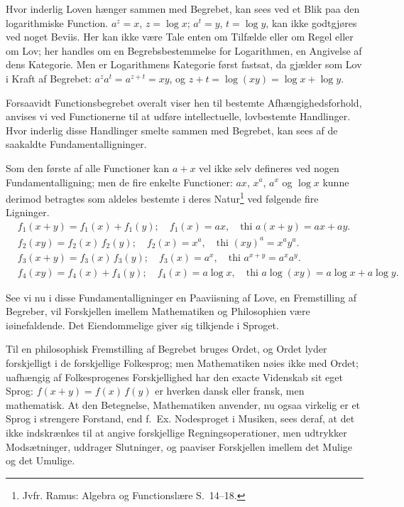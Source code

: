 \documentclass[12pt]{book}
\newcommand{\opage}[1]{\marginnote{\footnotesize\textit{[#1]}}}
\begin{document}
Hvor inderlig Loven hænger sammen med Begrebet, kan sees ved et Blik paa den
logarithmiske Function. $a^{z} = x$, $z = \log x$; $a^{t} = y$, $t = \log y$,
kan ikke godtgjøres ved noget Beviis. Her kan ikke være Tale enten om Tilfælde
eller om Regel eller om Lov; her handles om
\opage{9} en Begrebsbestemmelse for Logarithmen, en Angivelse af dens Kategorie. Men er
Logarithmens Kategorie først fastsat, da gjælder som Lov i Kraft af Begrebet:
$a^{z}a^{t} = a^{z+t} = xy$, og $z+t = \log(xy) = \log x + \log y$.

Forsaavidt Functionsbegrebet overalt viser hen til bestemte
Afhængighedsforhold, anvises vi ved Functionerne til at udføre intellectuelle,
lovbestemte Handlinger. Hvor inderlig disse Handlinger smelte sammen med
Begrebet, kan sees af de saakaldte Fundamentalligninger.

Som den første af alle Functioner kan $a+x$ vel ikke selv defineres ved nogen
Fundamentalligning; men de fire enkelte Functioner: $ax$, $x^{a}$, $a^{x}$ og
$\log x$ kunne derimod betragtes som aldeles bestemte i deres
Natur\footnote{Jvfr. Ramus: Algebra og Functionslære S.\ 14--18.} ved følgende
fire Ligninger.
\[
\begin{aligned}
&f_{1}(x+y) = f_{1}(x) + f_{1}(y); \quad f_{1}(x) = ax,
      \quad \text{thi } a(x+y) = ax + ay.\\[2pt]
&f_{2}(xy) = f_{2}(x)\,f_{2}(y); \quad f_{2}(x) = x^{a},
      \quad \text{thi } (xy)^{a} = x^{a}y^{a}.\\[2pt]
&f_{3}(x+y) = f_{3}(x)\,f_{3}(y); \quad f_{3}(x) = a^{x},
      \quad \text{thi } a^{x+y} = a^{x}a^{y}.\\[2pt]
&f_{4}(xy) = f_{4}(x) + f_{4}(y); \quad f_{4}(x) = a\log x,
      \quad \text{thi } a\log(xy) = a\log x + a\log y.
\end{aligned}
\]

See vi nu i disse Fundamentalligninger en Paaviisning af Love, en Fremstilling
af Begreber, vil Forskjellen imellem Mathematiken og Philosophien være
iøinefaldende. Det Eiendommelige giver sig tilkjende i Sproget.

Til en philosophisk Fremstilling af Begrebet bruges Ordet, og Ordet lyder
forskjelligt i de forskjellige Folkesprog; men Mathematiken nøies ikke med
Ordet; uafhængig af Folkesprogenes Forskjellighed har den exacte Videnskab sit
eget Sprog: $f(x+y) = f(x)\,f(y)$ er hverken dansk eller fransk, men mathematisk.
\opage{10} At den Betegnelse, Mathematiken anvender, nu ogsaa virkelig er et Sprog i
strengere Forstand, end f.\ Ex. Nodesproget i Musiken, sees deraf, at det ikke
indskrænkes til at angive forskjellige Regningsoperationer, men udtrykker
Modsætninger, uddrager Slutninger, og paaviser Forskjellen imellem det Mulige og
det Umulige.
\end{document}
